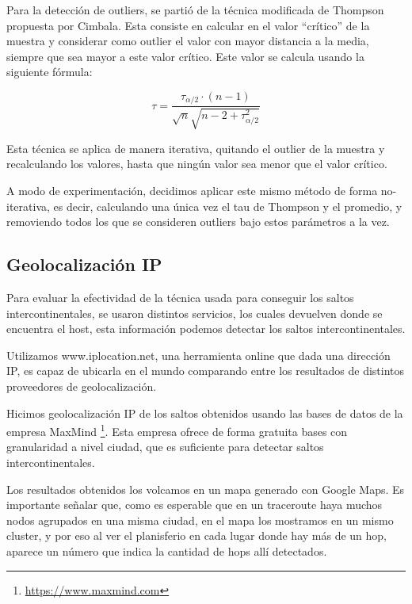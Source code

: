 Para la detección de outliers, se partió de la técnica modificada de Thompson propuesta por Cimbala. Esta consiste en calcular en el valor “crítico” de la muestra y considerar como outlier el valor con mayor distancia a la media, siempre que sea mayor a este valor crítico. Este valor se calcula usando la siguiente fórmula:

\[ \tau = \frac{\tau_{\alpha / 2} \cdot (n - 1) }{\sqrt{n} \sqrt{n - 2 + \tau_{\alpha / 2}^2}} \]

Esta técnica se aplica de manera iterativa, quitando el outlier de la muestra y recalculando los valores, hasta que ningún valor sea menor que el valor crítico.

A modo de experimentación, decidimos aplicar este mismo método de forma no-iterativa, es decir, calculando una única vez el tau de Thompson y el promedio, y removiendo todos los que se consideren outliers bajo estos parámetros a la vez.

\subsection{Geolocalización IP}

Para evaluar la efectividad de la técnica usada para conseguir los saltos intercontinentales, se usaron distintos servicios, los cuales devuelven donde se encuentra el host, esta información podemos detectar los saltos intercontinentales.

Utilizamos www.iplocation.net, una herramienta online que dada una dirección IP, es capaz de ubicarla en el mundo comparando entre los resultados de distintos proveedores de geolocalización.

Hicimos geolocalización IP de los saltos obtenidos usando las bases de datos de la empresa MaxMind \footnote{\url{https://www.maxmind.com}}. Esta empresa ofrece de forma gratuita bases con granularidad a nivel ciudad, que es suficiente para detectar saltos intercontinentales.

Los resultados obtenidos los volcamos en un mapa generado con Google Maps. Es importante señalar que, como es esperable que en un traceroute haya muchos nodos agrupados en una misma ciudad, en el mapa los mostramos en un mismo cluster, y por eso al ver el planisferio en cada lugar donde hay más de un hop, aparece un número que indica la cantidad de hops allí detectados.


